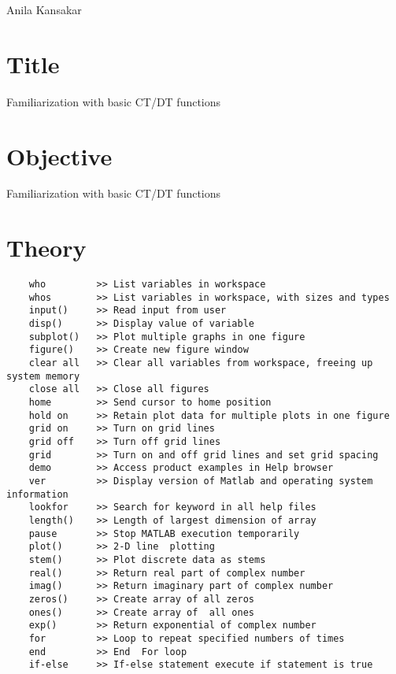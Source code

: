 \documentclass[a4paper,11pt]{article}
\begin{document}
{Anila  Kansakar}

\renewcommand{\contentsname}{Table of Contents}
\tableofcontents

\pagebreak
\lstlistoflistings
\vspace{10em}
\listoffigures
\pagebreak
{}

\section{Title} {\large Familiarization with basic CT/DT functions }
\section{Objective}
Familiarization with basic CT/DT functions



\section{Theory}



\begin{verbatim}
    who         >> List variables in workspace
    whos        >> List variables in workspace, with sizes and types
    input()     >> Read input from user
    disp()      >> Display value of variable
    subplot()   >> Plot multiple graphs in one figure
    figure()    >> Create new figure window
    clear all   >> Clear all variables from workspace, freeing up system memory
    close all   >> Close all figures
    home        >> Send cursor to home position
    hold on     >> Retain plot data for multiple plots in one figure
    grid on     >> Turn on grid lines
    grid off    >> Turn off grid lines 
    grid        >> Turn on and off grid lines and set grid spacing
    demo        >> Access product examples in Help browser
    ver         >> Display version of Matlab and operating system information 
    lookfor     >> Search for keyword in all help files
    length()    >> Length of largest dimension of array
    pause       >> Stop MATLAB execution temporarily 
    plot()      >> 2-D line  plotting 
    stem()      >> Plot discrete data as stems
    real()      >> Return real part of complex number
    imag()      >> Return imaginary part of complex number
    zeros()     >> Create array of all zeros 
    ones()      >> Create array of  all ones 
    exp()       >> Return exponential of complex number
    for         >> Loop to repeat specified numbers of times
    end         >> End  For loop 
    if-else     >> If-else statement execute if statement is true
\end{verbatim}
\end{document}

